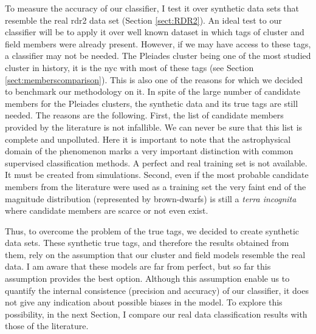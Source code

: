 To measure the accuracy of our classifier, I test it over synthetic data sets that resemble the real \gls{rdr2} data set (Section \ref{sect:RDR2}). An ideal test to our classifier will be to apply it over well known dataset in which tags of cluster and field members were already present. However, if we may have access to these tags, a classifier may not be needed. The Pleiades cluster being one of the most studied cluster in history, it is the \gls{nyc} with most of these tags (see Section \ref{sect:memberscomparison}). This is also one of the reasons for which we decided to benchmark our methodology on it. In spite of the large number of candidate members for the Pleiades clusters, the synthetic data and its true tags are still needed. The reasons are the following. First, the list of candidate members provided by the literature is not infallible. We can never be sure that this list is complete and unpolluted. Here it is important to note that the astrophysical domain of the phenomenon marks a very important distinction with common supervised classification methods. A perfect and real training set is not available. It must be created from simulations. Second, even if the most probable candidate members from the literature were used as a training set \cite[as done for example by][]{Sarro2014} the very faint end of the magnitude distribution (represented by brown-dwarfs) is still a \emph{terra incognita} where candidate members are scarce or not even exist. 

Thus, to overcome the problem of the true tags, we decided to create synthetic data sets. These synthetic true tags, and therefore the results obtained from them, rely on the assumption that our cluster and field models resemble the real data. I am aware that these models are far from perfect, but so far this assumption provides the best option. Although this assumption enable us to quantify the internal consistence (precision and accuracy) of our classifier, it does not give any indication about possible biases in the model. To explore this possibility, in the next Section, I compare our real data classification results with those of the literature.

